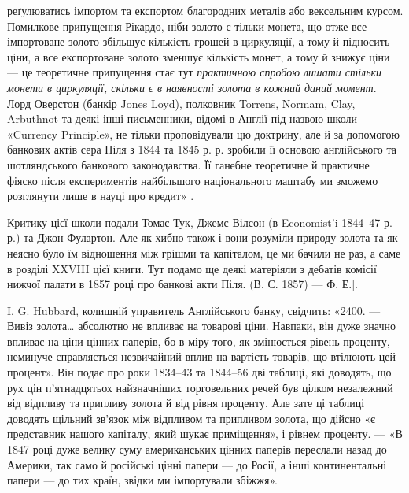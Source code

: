 \parcont{}  %
реґулюватись імпортом та експортом благородних металів або вексельним курсом.
Помилкове припущення Рікардо, ніби золото є тільки монета, що отже все імпортоване
золото збільшує кількість грошей в циркуляції, а тому й підносить ціни,
а все експортоване золото зменшує кількість монет, а тому й знижує ціни —
це теоретичне припущення стає тут \emph{практичною спробою лишати стільки
монети в циркуляції, скільки є в наявності золота в кожний даний
момент}. Лорд Оверстон (банкір Jones Loyd), полковник Torrens, Normam, Clay,
Arbuthnot та деякі інші письменники, відомі в Англії під назвою школи «Currency
Principle», не тільки проповідували цю доктрину, але й за допомогою банкових
актів сера Піля з 1844 та 1845 р. р. зробили її основою англійського та шотляндського
банкового законодавства. Її ганебне теоретичне й практичне фіяско після
експериментів найбільшого національного маштабу ми зможемо розглянути лише
в науці про кредит» .

Критику цієї школи подали Томас Тук, Джемс Вілсон (в Economist’i 1844--47 р. р.)
та Джон Фулартон. Але як хибно також і вони розуміли природу золота
та як неясно було їм відношення між грішми та капіталом, це ми бачили не
раз, а саме в розділі XXVIII цієї книги. Тут подамо ще деякі матеріяли з дебатів
комісії нижчої палати в 1857 році про банкові акти Піля. (В. С. 1857) — Ф. Е.].

I. G. Hubbard, колишній управитель Англійського банку, свідчить: «2400. —
Вивіз золота\dots{} абсолютно не впливає на товарові ціни. Навпаки, він дуже
значно впливає на ціни цінних паперів, бо в міру того, як змінюється рівень
проценту, неминуче справляється незвичайний вплив на вартість товарів, що втілюють
цей процент». Він подає про роки 1834--43 та 1844--56 дві таблиці,
які доводять, що рух цін п’ятнадцятьох найзначніших торговельних речей був
цілком незалежний від відпливу та припливу золота й від рівня проценту. Але
зате ці таблиці доводять щільний зв’язок між відпливом та припливом золота,
що дійсно «є представник нашого капіталу, який шукає приміщення», і рівнем
проценту. — «В 1847 році дуже велику суму американських цінних паперів переслали
назад до Америки, так само й російські цінні папери — до Росії, а інші
континентальні папери — до тих країн, звідки ми імпортували збіжжя».


